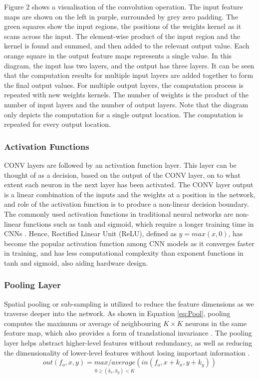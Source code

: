 \documentclass[12pt]{article}
\begin{document}
Figure 2 shows a visualisation of the convolution operation. The input feature maps are shown on the left in purple, surrounded by grey zero padding. The green squares show the input regions, the positions of the weights kernel as it scans across the input. The element-wise product of the input region and the kernel is found and summed, and then added to the relevant output value. Each orange square in the output feature maps represents a single value. In this diagram, the input has two layers, and the output has three layers. It can be seen that the computation results for multiple input layers are added together to form the final output values. For multiple output layers, the computation process is repeated with new weights kernels. The number of weights is the product of the number of input layers and the number of output layers. Note that the diagram only depicts the computation for a single output location. The computation is repeated for every output location. 


\subsubsection{Activation Functions}
\label{sec:Background-CNN-Activation}

CONV layers are followed by an activation function layer. This layer can be thought of as a decision, based on the output of the CONV layer, on to what extent each neuron in the next layer has been activated. The CONV layer output is a linear combination of the inputs and the weights at a position in the network, and role of the activation function is to produce a non-linear decision boundary. The commonly used activation functions in traditional neural networks are non-linear functions such as tanh and sigmoid, which require a longer training time in CNNs \cite{AlexNet}. Hence, Rectified Linear Unit (ReLU), defined as $y = max(x,0)$, has become the popular activation function among CNN models as it converges faster in training, and has less computational complexity than exponent functions in tanh and sigmoid, also aiding hardware design.

\subsubsection{Pooling Layer}
\label{sec:Background-CNN-Pool}


Spatial pooling or sub-sampling is utilized to reduce the feature dimensions as we traverse deeper into the network. As shown in Equation \ref{eq:Pool}, pooling computes the maximum or average of neighbouring $K\times K$ neurons in the same feature map, which also provides a form of translational invariance \cite{PoolAnalysis}. The pooling layer helps abstract higher-level features without redundancy, as well as reducing the dimensionality of lower-level features without losing important information \cite{SudaFpgaAccelerator}.
\begin{equation}
out(f_o,x,y)=\underset{0\geqslant (k_x,k_y)<K}{max/average}(in(f_o,x+k_x,y+k_y))
\label{eq:Pool}
\end{equation}
\end{document}
